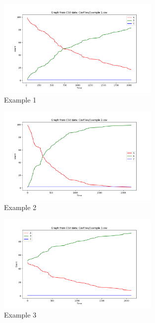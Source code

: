 \documentclass[a4paper]{article}
\begin{document}
\begin{figure}[H]
  \centering
  \includegraphics[width=0.7\textwidth]{images/Example 1.png}
  \caption{Example 1}
\end{figure}

\begin{figure}[H]
  \centering
  \includegraphics[width=0.7\textwidth]{images/Example 2.png}
  \caption{Example 2}
\end{figure}

\begin{figure}[H]
  \centering
  \includegraphics[width=0.7\textwidth]{images/Example 3.png}
  \caption{Example 3}
\end{figure}
\end{document}
